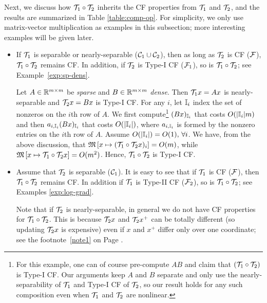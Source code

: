 Next, we discuss how ${\mathcal{T}}_1\circ {\mathcal{T}}_2$ inherits the CF properties from ${\mathcal{T}}_1$ and ${\mathcal{T}}_2$, and the results are summarized in Table \ref{table:comp-op}. For simplicity, we only use matrix-vector multiplication as examples in this subsection; more interesting examples will be given later.%
\begin{itemize}

\item If ${\mathcal{T}}_1$ is separable or nearly-separable (${\mathcal{C}}_1\cup{\mathcal{C}}_2$), then as long as ${\mathcal{T}}_2$ is CF (${\mathcal{F}}$), ${\mathcal{T}}_1\circ{\mathcal{T}}_2$ remains CF. In addition, if ${\mathcal{T}}_2$ is Type-I CF (${\mathcal{F}}_1$), so is ${\mathcal{T}}_1\circ{\mathcal{T}}_2$; see Example~\ref{exp:sp-dens}. 
\begin{example}\label{exp:sp-dens}
Let $A\in\mathbb{R}^{m\times m}$ be \emph{sparse} and $B\in\mathbb{R}^{m\times m}$ \emph{dense}. Then ${\mathcal{T}}_1 x=Ax$ is nearly-separable and ${\mathcal{T}}_2 x=Bx$ is Type-I CF.  For any $i$, let $\mathbb{I}_i$ index the set of nonzeros on the $i$th row of $A$. We first compute\footnote{For this example, one can of course pre-compute $AB$ and claim that $({\mathcal{T}}_1\circ{\mathcal{T}}_2)$ is Type-I CF. Our arguments keep $A$ and $B$ separate and only use the nearly-separability of ${\mathcal{T}}_1$ and Type-I CF of ${\mathcal{T}}_2$, so our result holds for any such composition even when ${\mathcal{T}}_1$ and ${\mathcal{T}}_2$ are nonlinear.} $(Bx)_{\mathbb{I}_i}$ that costs $O(|\mathbb{I}_i|m)$ and then $a_{i,\mathbb{I}_i} (Bx)_{\mathbb{I}_i}$ that costs $O(|\mathbb{I}_i|)$, where $a_{i,\mathbb{I}_i}$ is formed by the nonzero entries on the $i$th row of $A$. Assume $O(|\mathbb{I}_i|)=O(1),\,\forall i$. We have, from the above discussion, that $\mathfrak{M}\left[{x}\mapsto {({\mathcal{T}}_1\circ{\mathcal{T}}_2 x)_i}\right]=O(m)$,
while $\mathfrak{M}\left[{x}\mapsto {{\mathcal{T}}_1\circ{\mathcal{T}}_2 x}\right]=O(m^2)$. Hence, ${\mathcal{T}}_1\circ{\mathcal{T}}_2$ is Type-I CF.
\end{example}


\item Assume that ${\mathcal{T}}_2$ is separable (${\mathcal{C}}_1$). It is easy to see that if ${\mathcal{T}}_1$ is CF (${\mathcal{F}}$), then ${\mathcal{T}}_1\circ {\mathcal{T}}_2$ remains CF. In addition if ${\mathcal{T}}_1$ is Type-II CF (${\mathcal{F}}_2$), so is ${\mathcal{T}}_1\circ{\mathcal{T}}_2$; see Examples \ref{exp:log-grad}. %

Note that if ${\mathcal{T}}_2$ is nearly-separable, in general we do not have CF properties for ${\mathcal{T}}_1\circ{\mathcal{T}}_2$. This is because ${\mathcal{T}}_2 x$ and ${\mathcal{T}}_2 x^+$ can be totally different (so updating ${\mathcal{T}}_2 x$ is expensive) even if $x$ and $x^+$ differ only over one coordinate; see the  footnote~\ref{note1} on Page \pageref{note1}. %



\end{itemize}
